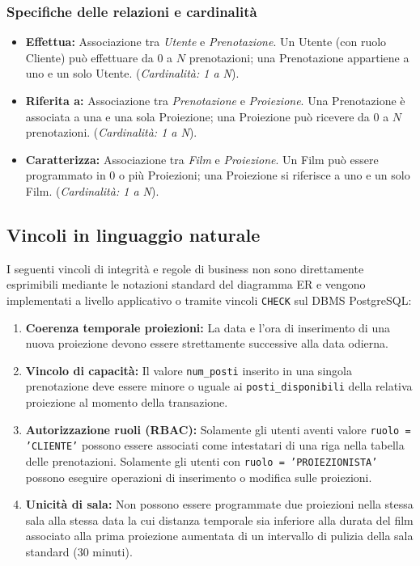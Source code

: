 \documentclass[12pt, a4paper]{article}
\begin{document}
\subsubsection{Specifiche delle relazioni e cardinalità}
\begin{itemize}
    \item \textbf{Effettua:} Associazione tra \textit{Utente} e \textit{Prenotazione}. Un Utente (con ruolo Cliente) può effettuare da $0$ a $N$ prenotazioni; una Prenotazione appartiene a uno e un solo Utente. (\textit{Cardinalità: 1 a N}).
    \item \textbf{Riferita a:} Associazione tra \textit{Prenotazione} e \textit{Proiezione}. Una Prenotazione è associata a una e una sola Proiezione; una Proiezione può ricevere da $0$ a $N$ prenotazioni. (\textit{Cardinalità: 1 a N}).
    \item \textbf{Caratterizza:} Associazione tra \textit{Film} e \textit{Proiezione}. Un Film può essere programmato in $0$ o più Proiezioni; una Proiezione si riferisce a uno e un solo Film. (\textit{Cardinalità: 1 a N}).
\end{itemize}

\subsection{Vincoli in linguaggio naturale}
I seguenti vincoli di integrità e regole di business non sono direttamente esprimibili mediante le notazioni standard del diagramma ER e vengono implementati a livello applicativo o tramite vincoli \texttt{CHECK} sul DBMS PostgreSQL:
\begin{enumerate}
    \item \textbf{Coerenza temporale proiezioni:} La data e l'ora di inserimento di una nuova proiezione devono essere strettamente successive alla data odierna.
    \item \textbf{Vincolo di capacità:} Il valore \texttt{num\_posti} inserito in una singola prenotazione deve essere minore o uguale ai \texttt{posti\_disponibili} della relativa proiezione al momento della transazione.
    \item \textbf{Autorizzazione ruoli (RBAC):} Solamente gli utenti aventi valore \texttt{ruolo = 'CLIENTE'} possono essere associati come intestatari di una riga nella tabella delle prenotazioni. Solamente gli utenti con \texttt{ruolo = 'PROIEZIONISTA'} possono eseguire operazioni di inserimento o modifica sulle proiezioni.
    \item \textbf{Unicità di sala:} Non possono essere programmate due proiezioni nella stessa sala alla stessa data la cui distanza temporale sia inferiore alla durata del film associato alla prima proiezione aumentata di un intervallo di pulizia della sala standard (30 minuti).
\end{enumerate}
\end{document}
